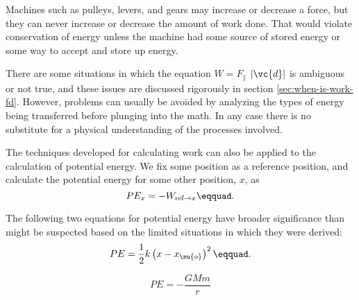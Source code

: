 \begin{summary}
\begin{summarytext}
Machines such as pulleys, levers, and gears may increase or
decrease a force, but they can never increase or decrease
the amount of work done. That would violate conservation of
energy unless the machine had some source of stored energy
or some way to accept and store up energy.

There are some situations in which the equation $W=F_{\parallel}$
$|\vc{d}|$ is ambiguous or not true, and these issues are
discussed rigorously in section \ref{sec:when-is-work-fd}. However, problems can
usually be avoided by analyzing the types of energy being
transferred before plunging into the math. In any case there
is no substitute for a physical understanding of the processes involved.

The techniques developed for calculating work can also be
applied to the calculation of potential energy. We fix some
position as a reference position, and calculate the
potential energy for some other position, $x$, as
\begin{equation*}
                PE_x  =  -W_{\text{ref}\rightarrow x}\eqquad.
\end{equation*}

The following two equations for potential energy have
broader significance than might be suspected based on the
limited situations in which they were derived:
\begin{equation*}
  PE = \frac{1}{2}k\left(x-x_\zu{o}\right)^2\eqquad.
\end{equation*}
\begin{longnoteafterequation}
\end{longnoteafterequation}
\begin{equation*}
                PE  = -\frac{GMm}{r}
\end{equation*}
\begin{longnoteafterequation}
\end{longnoteafterequation}
\end{summarytext}

\end{summary}
